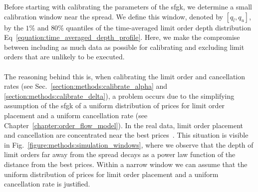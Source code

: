 \documentclass[11pt, a4paper]{thesis}  %
\begin{document}
Before starting with calibrating the parameters of the \ac{sfgk}, we determine a small calibration window near the spread. We define this window, denoted by $[q_l, q_u]$, by the $1$\% and $80$\%  quantiles of the time-averaged limit order depth distribution Eq~\ref{equation:time_averaged_depth_profile}. Here, we make the compromise between including as much data as possible for calibrating and excluding limit orders that are unlikely to be executed. 
\\
\\
\noindent The reasoning behind this is, when calibrating the limit order and cancellation rates (see Sec.~\ref{section:methods:calibrate_alpha} and \ref{section:methods:calibrate_delta}), a problem occurs due to the simplifying assumption of the \ac{sfgk} of a uniform distribution of prices for limit order placement and a uniform cancellation rate (see Chapter~\ref{chapter:order_flow_model}). In the real data, limit order placement and cancellation are concentrated near the best prices~\cite{Bouchaud:2002:statistical}. This situation is visible in Fig.~\ref{figure:methods:simulation_windows}, where we observe that the depth of limit orders far away from the spread decays as a power law function of the distance from the best prices. Within a narrow window we can assume that the uniform distribution of prices for limit order placement and a uniform cancellation rate is justified. 

   
\end{document}
